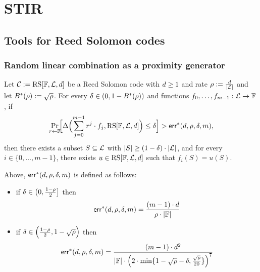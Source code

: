 
\section{STIR}

\subsection{Tools for Reed Solomon codes}
\subsubsection{Random linear combination as a proximity generator}\label{sec:proximity_gap}

\begin{theorem}\label{thm:proximity_gap}
\leanok
{}
    Let $\mathcal{C} := \mathrm{RS}[\mathbb{F},\mathcal{L},d]$ be a Reed Solomon code with $d\ge1$ and rate $\rho:=\frac{d}{|\mathcal{L}|}$ and let $B^*(\rho):=\sqrt{\rho}$. For every $\delta \in (0,1 - B^*(\rho))$ and functions $f_0,\ldots,f_{m-1} : \mathcal{L} \to \mathbb{F}$, if
    \[
    \Pr_{r\leftarrow\mathbb{F}}\!\Bigl[
      \Delta\Bigl(\sum_{j=0}^{m-1} r^j\cdot {f_j},\mathrm{RS}[\mathbb{F},\mathcal{L},d]\Bigr)
      \le \delta
    \Bigr]>\mathsf{err}^*(d,\rho,\delta,m),
    \]
    then there exists a subset $S \subseteq \mathcal{L}$ with $|S| \ge (1 - \delta)\cdot|\mathcal{L}|$,
    and for every $i \in \{0,\ldots,m-1\}$, there exists $u \in \mathrm{RS}[\mathbb{F},\mathcal{L},d]$ such that $f_i(S) = u(S)$.

    \medskip

    \noindent
    Above, $\mathsf{err}^*(d,\rho,\delta,m)$ is defined as follows:
    \begin{itemize}
        \item if $\delta \in \left(0,\frac{1-\rho}{2}\right]$ then
            \[
                \mathsf{err}^*(d,\rho,\delta,m)=\frac{(m-1)\cdot d}{\rho\cdot|\mathbb{F}|}
            \]
        \item if $\delta \in \Bigl(\frac{1-\rho}{2}, 1-\sqrt{\rho}\Bigr)$ then
        \[
            \mathsf{err}^*(d,\rho,\delta,m)=\frac{(m-1)\cdot {d}^2}{|\mathbb{F}|\cdot{\Bigl(2\cdot\min\{1-\sqrt{\rho}-\delta,\frac{\sqrt{\rho}}{20}\}\Bigr)}^7}
        \]
    \end{itemize}
\end{theorem}

